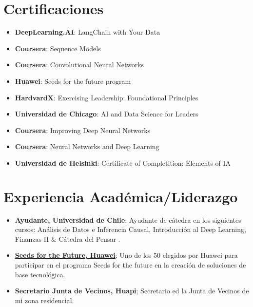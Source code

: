 \documentclass[letterpaper,11pt]{article}
\newcommand{\resumeItem}[2]{
  \item\small{
    \textbf{#1}{#2 \vspace{-2pt}}
  }
}
\newcommand{\resumeSubItem}[2]{\resumeItem{#1}{#2}\vspace{-4pt}}
\newcommand{\resumeSubItemcol}[2]{\resumeItem{#1}{#2}\vspace{-8pt}}
\newcommand{\resumeSubHeadingListStart}{\begin{itemize}[leftmargin=*]}
\newcommand{\resumeSubHeadingListEnd}{\end{itemize}}
\begin{document}
\section{Certificaciones}
\vspace{-15pt}
  \begin{multicols}{2}
    \resumeSubHeadingListStart
    \resumeSubItemcol{DeepLearning.AI}{: LangChain with Your Data}
    \resumeSubItemcol{Coursera}{: Sequence Models}
    \resumeSubItemcol{Coursera}{: Convolutional Neural Networks}
    \resumeSubItemcol{Huawei}{: Seeds for the future program}
    \resumeSubItemcol{HardvardX}{: Exercising Leadership: Foundational Principles}
    \resumeSubItemcol{Universidad de Chicago}{: AI and Data Science for Leaders}
    \resumeSubItemcol{Coursera}{: Improving Deep Neural Networks}
    \resumeSubItemcol{Coursera}{: Neural Networks and Deep Learning}
    \resumeSubItemcol{Universidad de Helsinki}{: Certificate of Completition: Elements of IA}
  \resumeSubHeadingListEnd
  \end{multicols}
\section{Experiencia Académica/Liderazgo}
 \resumeSubHeadingListStart
  \resumeSubItem
    {Ayudante, Universidad de Chile}
    {; Ayudante de cátedra en los siguientes cursos: Análisis de Datos e Inferencia Causal, Introducción al Deep Learning, Finanzas II \& Cátedra del Pensar
    .}
  \resumeSubItem
    {\href{https://ingenieria.uchile.cl/noticias/188882/estudiantes-fcfm-destacaron-en-5ta-version-del-programa-huawei}{Seeds for the Future, Huawei}}
    {; Uno de los 50 elegidos por Huawei para participar en el programa Seeds for the future en la creación de soluciones de base tecnológica.}
  \resumeSubItem
    {Secretario Junta de Vecinos, Huapi}
    {; Secretario ed la Junta de Vecinos de mi zona residencial.}
  \resumeSubHeadingListEnd
\end{document}

